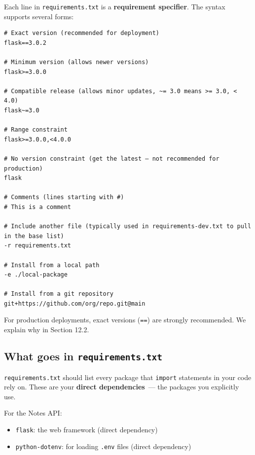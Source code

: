 Each line in \texttt{requirements.txt} is a \textbf{requirement specifier}. The syntax supports several forms:

\begin{outputbox}
\begin{Verbatim}[fontsize=\codesize, breaklines, breakanywhere, breaksymbolleft={\tiny\textcolor{muted}{$\hookrightarrow$}}]
# Exact version (recommended for deployment)
flask==3.0.2

# Minimum version (allows newer versions)
flask>=3.0.0

# Compatible release (allows minor updates, ~= 3.0 means >= 3.0, < 4.0)
flask~=3.0

# Range constraint
flask>=3.0.0,<4.0.0

# No version constraint (get the latest — not recommended for production)
flask

# Comments (lines starting with #)
# This is a comment

# Include another file (typically used in requirements-dev.txt to pull in the base list)
-r requirements.txt

# Install from a local path
-e ./local-package

# Install from a git repository
git+https://github.com/org/repo.git@main
\end{Verbatim}
\end{outputbox}

\noindent{}For production deployments, exact versions (\texttt{==}) are strongly recommended. We explain why in Section 12.2.

\subsection*{\texorpdfstring{What goes in \texttt{requirements.txt}}{What goes in requirements.txt}}\label{12-dependency-declaration:what-goes-in-requirementstxt}

\texttt{requirements.txt} should list every package that \texttt{import} statements in your code rely on. These are your \textbf{direct dependencies}~--- the packages you explicitly use.

For the Notes API:

\begin{itemize}
\tightlist
\item
  \texttt{flask}: the web framework (direct dependency)
\item
  \texttt{python-dotenv}: for loading \texttt{.env} files (direct dependency)
\end{itemize}

